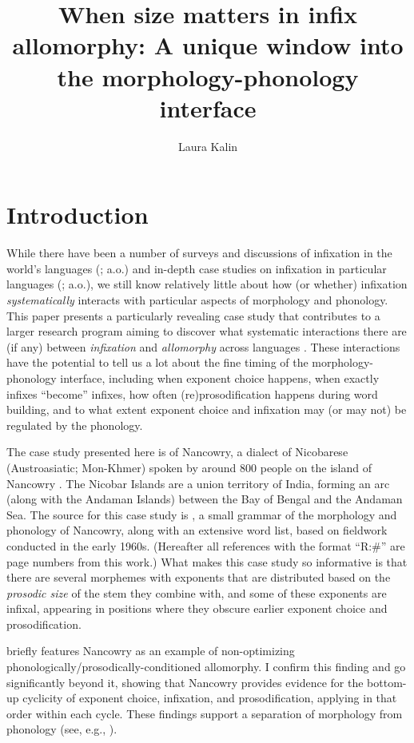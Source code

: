 \documentclass[output=paper,colorlinks,citecolor=brown,
]{langscibook}
\author{Laura Kalin\affiliation{Princeton University}
}
\title{When size matters in infix allomorphy: A unique window into the morphology-phonology interface}
\begin{document}
\maketitle

\section{Introduction}


While there have been a number of surveys and discussions of infixation in the world's languages (\citealt{Mor77,Mor00,Ultan75,Yu07,Stek12,Blevins14}; a.o.) and in-depth case studies on infixation in particular languages (\citealt{HM91,Blevins99,Harizanov17,Yu17}; a.o.), we still know relatively little about how (or whether) infixation {\it systematically} interacts with particular aspects of morphology and phonology. This paper presents a particularly revealing case study that contributes to a larger research program aiming to discover what systematic interactions there are (if any) between {\it infixation} and {\it allomorphy} across languages \citep{KalinIP}. These interactions have the potential to tell us a lot about the fine timing of the morphology-phonology interface, including when exponent choice happens, when exactly infixes ``become'' infixes, how often (re)prosodification happens during word building, and to what extent exponent choice and infixation may (or may not) be regulated by the phonology. %

The case study presented here is of Nancowry, a dialect of Nicobarese (Austroasiatic; Mon-Khmer) spoken by around 800 people on the island of Nancowry \citep[3]{Rad81}. The Nicobar Islands are a union territory of India, forming an arc (along with the Andaman Islands) between the Bay of Bengal and the Andaman Sea. The source for this case study is \citealt{Rad81}, a small grammar of the morphology and phonology of Nancowry, along with an extensive word list, based on fieldwork conducted in the early 1960s. (Hereafter all references with the format ``R:\#'' are page numbers from this work.) What makes this case study so informative is that there are several morphemes with exponents that are distributed based on the {\it prosodic size} of the stem they combine with, and some of these exponents are infixal, appearing in positions where they obscure earlier exponent choice and prosodification. 

\citet{Paster05,Paster06} briefly features Nancowry as an example of non-optimizing phonologically/prosodically-conditioned allomorphy. I confirm this finding and go significantly beyond it, showing that Nancowry provides evidence for the bottom-up cyclicity of exponent choice, infixation, and prosodification, applying in that  order within each cycle. These findings support a separation of morphology from phonology (see, e.g., \citealt{HalleMarantz93,HalleMarantz94,Trommer01,Paster06,Yu07,Embick10,BS12,Pak16,Dawson17,KalinIP,Kalin20,Rolle20,Stanton20}).
\end{document}

